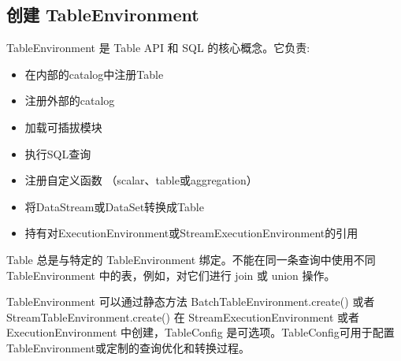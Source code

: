\documentclass[cn,11pt,chinese]{elegantbook}
\begin{document}
\subsection{创建 TableEnvironment}

TableEnvironment 是 Table API 和 SQL 的核心概念。它负责:

\begin{itemize}
    \item 在内部的catalog中注册Table
    \item 注册外部的catalog
    \item 加载可插拔模块
    \item 执行SQL查询
    \item 注册自定义函数 （scalar、table或aggregation）
    \item 将DataStream或DataSet转换成Table
    \item 持有对ExecutionEnvironment或StreamExecutionEnvironment的引用
\end{itemize}

Table 总是与特定的 TableEnvironment 绑定。不能在同一条查询中使用不同 TableEnvironment 中的表，例如，对它们进行 join 或 union 操作。

TableEnvironment 可以通过静态方法 BatchTableEnvironment.create() 或者 StreamTableEnvironment.create() 在 StreamExecutionEnvironment 或者 ExecutionEnvironment 中创建，TableConfig 是可选项。TableConfig可用于配置TableEnvironment或定制的查询优化和转换过程。
\end{document}
